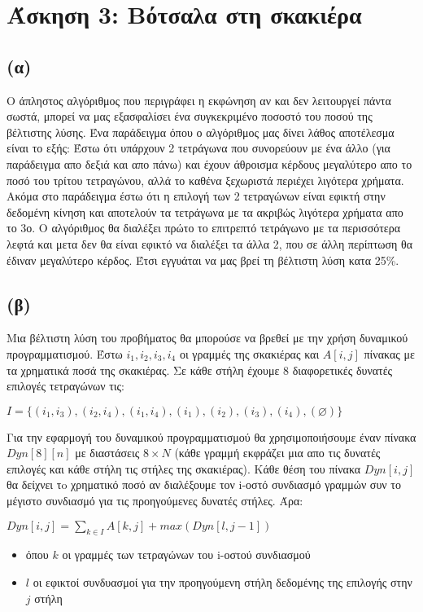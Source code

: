 \documentclass[a4paper,12pt]{report}
\begin{document}
\section*{Άσκηση 3: Βότσαλα στη σκακιέρα}
\subsection*{(α)}
Ο άπληστος αλγόριθμος που περιγράφει η εκφώνηση αν και δεν λειτουργεί πάντα σωστά, μπορεί να μας εξασφαλίσει ένα συγκεκριμένο ποσοστό του ποσού της βέλτιστης λύσης. Ένα παράδειγμα όπου ο αλγόριθμος μας δίνει λάθος αποτέλεσμα είναι το εξής: Έστω ότι υπάρχουν 2 τετράγωνα που συνορεύουν με ένα άλλο (για παράδειγμα απο δεξιά και απο πάνω) και έχουν άθροισμα κέρδους μεγαλύτερο απο το ποσό του τρίτου τετραγώνου, αλλά το καθένα ξεχωριστά περιέχει λιγότερα χρήματα. Ακόμα στο παράδειγμα έστω ότι η επιλογή των 2 τετραγώνων είναι εφικτή στην δεδομένη κίνηση και αποτελούν τα τετράγωνα με τα ακριβώς λιγότερα χρήματα απο το 3ο. Ο αλγόριθμος θα διαλέξει πρώτο το επιτρεπτό τετράγωνο με τα περισσότερα λεφτά και μετα δεν θα είναι εφικτό να διαλέξει τα άλλα 2, που σε άλλη περίπτωση θα έδιναν μεγαλύτερο κέρδος. Έτσι εγγυάται να μας βρεί τη βέλτιστη λύση κατα 25\%.    

\subsection*{(β)}
Μια βέλτιστη λύση του προβήματος θα μπορούσε να βρεθεί με την χρήση δυναμικού προγραμματισμού. Έστω $i_1,i_2,i_3,i_4$ οι γραμμές της σκακιέρας και $A[i,j]$ πίνακας με τα χρηματικά ποσά της σκακιέρας. Σε κάθε στήλη έχουμε 8 διαφορετικές δυνατές επιλογές τετραγώνων τις: 
\begin{center}
$I=\{(i_1,i_3),(i_2,i_4),(i_1,i_4),(i_1),(i_2),(i_3),(i_4),(\varnothing)\}$
\end{center}
Για την εφαρμογή του δυναμικού προγραμματισμού θα χρησιμοποιήσουμε έναν πίνακα $Dyn[8][n]$ με διαστάσεις $8 \times N$ (κάθε γραμμή εκφράζει μια απο τις δυνατές επιλογές και κάθε στήλη τις στήλες της σκακιέρας). Kάθε θέση του πίνακα $Dyn[i,j]$ θα δείχνει τo χρηματικό ποσό αν διαλέξουμε τον i-οστό συνδιασμό γραμμών συν το μέγιστο συνδιασμό για τις προηγούμενες δυνατές στήλες. Άρα:
\begin{center}
 $Dyn[i,j]=\displaystyle\sum\limits_{k \in I}{}{A[k,j]} + max(Dyn[l,j-1])$ 
\begin{itemize}
 \item όπου $k$ οι γραμμές των τετραγώνων του i-οστού συνδιασμού
 \item $l$ οι εφικτοί συνδυασμοί για την προηγούμενη στήλη δεδομένης της επιλογής στην $j$ στήλη
\end{itemize}
\end{center}
\end{document}
